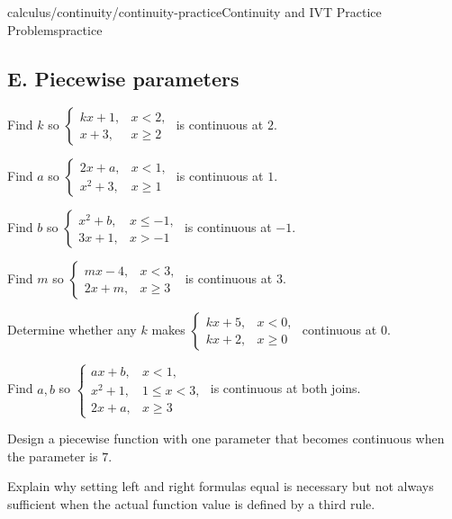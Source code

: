 \documentclass[11pt,openany]{book}
\theoremstyle{bgplain}
\begin{document}
\begin{webpage}{calculus/continuity/continuity-practice}{Continuity and IVT Practice Problems}{practice}
\subsection*{E. Piecewise parameters}
\begin{bgexercises}[label=\textbf{5.\arabic*},resume]
  \item Find \(k\) so \(\begin{cases}kx+1,&x<2,\\x+3,&x\ge2\end{cases}\) is continuous at \(2\).
  \item Find \(a\) so \(\begin{cases}2x+a,&x<1,\\x^2+3,&x\ge1\end{cases}\) is continuous at \(1\).
  \item Find \(b\) so \(\begin{cases}x^2+b,&x\le-1,\\3x+1,&x>-1\end{cases}\) is continuous at \(-1\).
  \item Find \(m\) so \(\begin{cases}mx-4,&x<3,\\2x+m,&x\ge3\end{cases}\) is continuous at \(3\).
  \item Determine whether any \(k\) makes \(\begin{cases}kx+5,&x<0,\\kx+2,&x\ge0\end{cases}\) continuous at \(0\).
  \item Find \(a,b\) so \(\begin{cases}ax+b,&x<1,\\x^2+1,&1\le x<3,\\2x+a,&x\ge3\end{cases}\) is continuous at both joins.
  \item Design a piecewise function with one parameter that becomes continuous when the parameter is \(7\).
  \item Explain why setting left and right formulas equal is necessary but not always sufficient when the actual function value is defined by a third rule.
\end{bgexercises}


\end{webpage}
\end{document}
